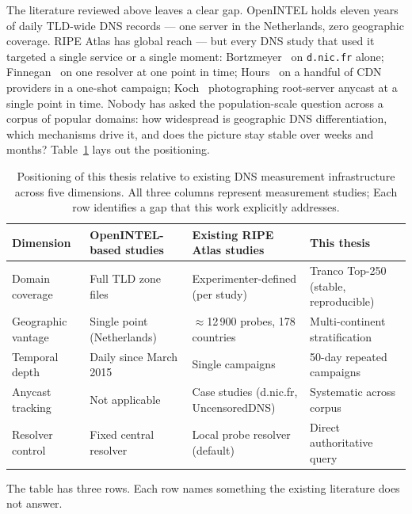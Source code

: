 The literature reviewed above leaves a clear gap. OpenINTEL holds eleven years of daily \ac{TLD}-wide \ac{DNS} records — one server in the Netherlands, zero geographic coverage. RIPE Atlas has global reach — but every \ac{DNS} study that used it targeted a single service or a single moment: Bortzmeyer~\cite{Bortzmeyer2013} on \texttt{d.nic.fr} alone; Finnegan~\cite{Finnegan2018} on one resolver at one point in time; Hours~\cite{Hours2016} on a handful of \ac{CDN} providers in a one-shot campaign; Koch~\cite{Koch2021} photographing root-server anycast at a single point in time. Nobody has asked the population-scale question across a corpus of popular domains: how widespread is geographic \ac{DNS} differentiation, which mechanisms drive it, and does the picture stay stable over weeks and months? Table~\ref{tab:gap_analysis} lays out the positioning.

\begin{table}[tp]
\centering
\small
\begin{tabularx}{\linewidth}{p{2.8cm} p{3.5cm} p{3.8cm} X}
\toprule
\textbf{Dimension} & \textbf{OpenINTEL-based studies}~\cite{vanRijswijk2016} & \textbf{Existing RIPE Atlas studies}~\cite{Bortzmeyer2013,Finnegan2018,Hours2016,Koch2021} & \textbf{This thesis} \\
\midrule
Domain coverage  & Full \ac{TLD} zone files & Experimenter-defined (per study) & Tranco Top-250 (stable, reproducible) \\
Geographic vantage    & Single point (Netherlands) & $\approx$12\,900 probes, 178 countries & Multi-continent stratification \\
Temporal depth & Daily since March 2015 & Single campaigns & 50-day repeated campaigns \\
Anycast tracking       & Not applicable & Case studies (d.nic.fr, UncensoredDNS) & Systematic across corpus \\
Resolver control   & Fixed central resolver & Local probe resolver (default) & Direct authoritative query \\
\bottomrule
\end{tabularx}
\caption{Positioning of this thesis relative to existing \ac{DNS} measurement infrastructure across five dimensions.
All three columns represent measurement studies; Each row identifies a gap that this work explicitly addresses.}
\label{tab:gap_analysis}
\end{table}

The table has three rows. Each row names something the existing literature does not answer.

